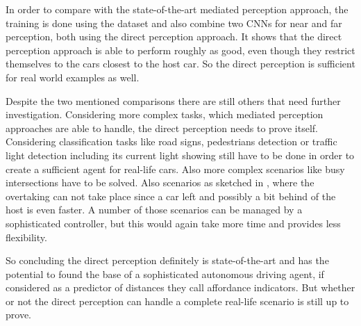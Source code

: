In order to compare with the state-of-the-art mediated perception approach, the training is done using the \kitti dataset and also combine two CNNs for near and far perception, both using the direct perception approach. It shows that the direct perception approach is able to perform roughly as good, even though they restrict themselves to the cars closest to the host car. So the direct perception is sufficient for real world examples as well. \cite{DeepDriving} \cite{chen2015deepdriving}

Despite the two mentioned comparisons there are still others that need further investigation. Considering more complex tasks, which mediated perception approaches are able to handle, the direct perception needs to prove itself.
Considering classification tasks like road signs, pedestrians detection or traffic light detection including its current light showing still have to be done in order to create a sufficient agent for real-life cars. 
Also more complex scenarios like busy intersections have to be solved. Also scenarios as sketched in , where the overtaking can not take place since a car left and possibly a bit behind of the host is even faster.
A number of those scenarios can be managed by a sophisticated controller, but this would again take more time and provides less flexibility.

So concluding the direct perception definitely is state-of-the-art and has the potential to found the base of a sophisticated autonomous driving agent, if considered as a predictor of distances they call affordance indicators. But whether or not the direct perception can handle a complete real-life scenario is still up to prove.